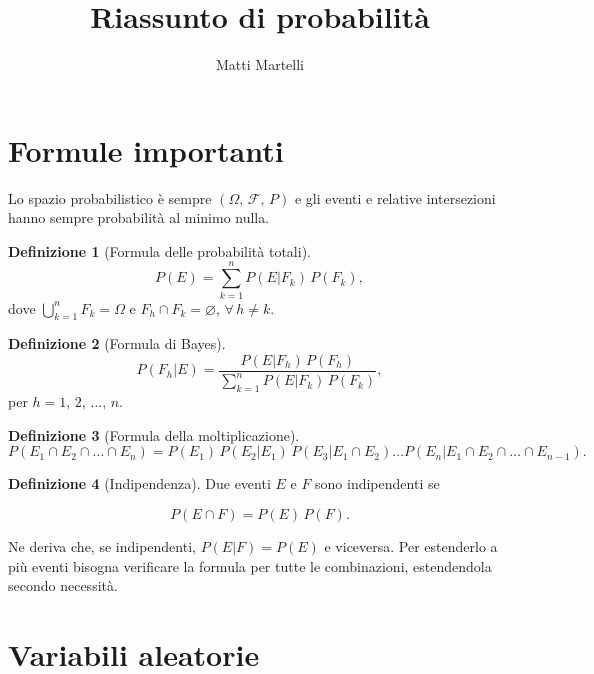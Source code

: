 \documentclass{article}
\title{Riassunto di probabilità}
\author{Matti Martelli}
\date{}
\theoremstyle{definition}
\newtheorem{definizione}{Definizione}
\begin{document}
    
    \maketitle

    \tableofcontents

    \section{Formule importanti}

        Lo spazio probabilistico è sempre \(\left(\Omega, \, \mathscr{F}, \, P\right)\) e gli eventi e relative intersezioni hanno
        sempre probabilità al minimo nulla.
    
        \begin{definizione}[Formula delle probabilità totali]
            \[
                P(E) = \sum_{k = 1}^n P(E|F_k) \, P(F_k),
            \]
            dove \(\bigcup_{k = 1}^n F_k = \Omega\) e \(F_h \cap F_k = \varnothing\), \(\forall \, h \neq k\). 
        \end{definizione}

        \begin{definizione}[Formula di Bayes]
            \[
                P(F_h | E) = \frac{P(E | F_h)  \, P(F_h)}{\sum_{k = 1}^n P(E | F_k) \, P(F_k)},
            \]
            per \(h = 1, \, 2, \, \ldots, \, n\).
        \end{definizione}

        \begin{definizione}[Formula della moltiplicazione]
            \[
                P(E_1 \cap E_2 \cap \ldots \cap E_n) = P(E_1) \, P(E_2 | E_1) \, P(E_3 | E_1 \cap E_2) \ldots P(E_n | E_1 \cap E_2 \cap \ldots \cap E_{n - 1}).
            \]
        \end{definizione}

        \begin{definizione}[Indipendenza]

            Due eventi \(E\) e \(F\) sono indipendenti se

            \[
                P(E \cap F) = P(E) \, P(F).
            \]

            Ne deriva che, se indipendenti, \(P(E | F) = P(E)\) e viceversa. Per estenderlo a più eventi bisogna verificare la formula
            per tutte le combinazioni, estendendola secondo necessità.
        \end{definizione}

    \section{Variabili aleatorie}
\end{document}
